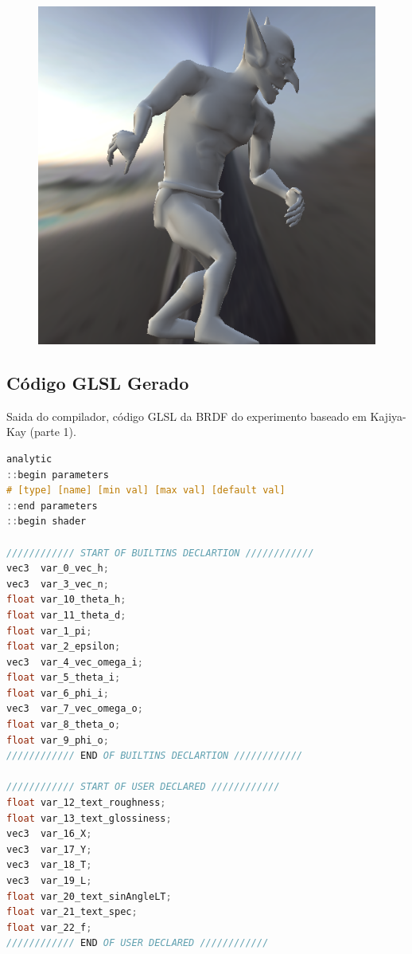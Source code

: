 \begin{figure}[H]
\endminipage\hfill
{}%
  \includegraphics[width=\linewidth]{./Imagens/brdfs/aniso-goblin.png}
\endminipage
\end{figure}

\subsection{Código GLSL Gerado}
\begin{codigo}[H]
    \caption{\small Saida do compilador, código GLSL da BRDF do experimento baseado em Kajiya-Kay (parte 1). }
    \label{cod-kajiya-eqlang-declarations}
\begin{lstlisting}[language=C, inputencoding=utf8]
analytic
::begin parameters
# [type] [name] [min val] [max val] [default val]
::end parameters
::begin shader

//////////// START OF BUILTINS DECLARTION ////////////
vec3  var_0_vec_h;
vec3  var_3_vec_n;
float var_10_theta_h;
float var_11_theta_d;
float var_1_pi;
float var_2_epsilon;
vec3  var_4_vec_omega_i;
float var_5_theta_i;
float var_6_phi_i;
vec3  var_7_vec_omega_o;
float var_8_theta_o;
float var_9_phi_o;
//////////// END OF BUILTINS DECLARTION ////////////

//////////// START OF USER DECLARED ////////////
float var_12_text_roughness;
float var_13_text_glossiness;
vec3  var_16_X;
vec3  var_17_Y;
vec3  var_18_T;
vec3  var_19_L;
float var_20_text_sinAngleLT;
float var_21_text_spec;
float var_22_f;
//////////// END OF USER DECLARED ////////////
\end{lstlisting}
\end{codigo}

